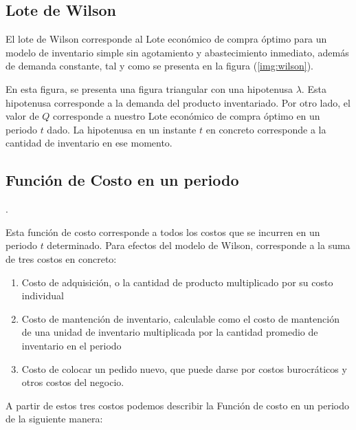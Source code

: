 \subsection{Lote de Wilson}
El lote de Wilson corresponde al Lote económico de compra óptimo para un modelo de inventario simple sin agotamiento y abastecimiento inmediato, además de demanda constante, tal y como se presenta en la figura (\ref{img:wilson}).

En esta figura, se presenta una figura triangular con una hipotenusa $\lambda$. Esta hipotenusa corresponde a la demanda del producto inventariado. Por otro lado, el valor de $Q$ corresponde a nuestro Lote económico de compra óptimo en un periodo $t$ dado. La hipotenusa en un instante $t$ en concreto corresponde a la cantidad de inventario en ese momento.

\subsection{Función de Costo en un periodo}.

Esta función de costo corresponde a todos los costos que se incurren en un periodo $t$ determinado. Para efectos del modelo de Wilson, corresponde a la suma de tres costos en concreto:

\begin{enumerate}
    \item Costo de adquisición, o la cantidad de producto multiplicado por su costo individual
    \item Costo de mantención de inventario, calculable como el costo de mantención de una unidad de inventario multiplicada por la cantidad promedio de inventario en el periodo
    \item Costo de colocar un pedido nuevo, que puede darse por costos burocráticos y otros costos del negocio.
\end{enumerate}

A partir de estos tres costos podemos describir la Función de costo en un periodo de la siguiente manera:\\ \\



